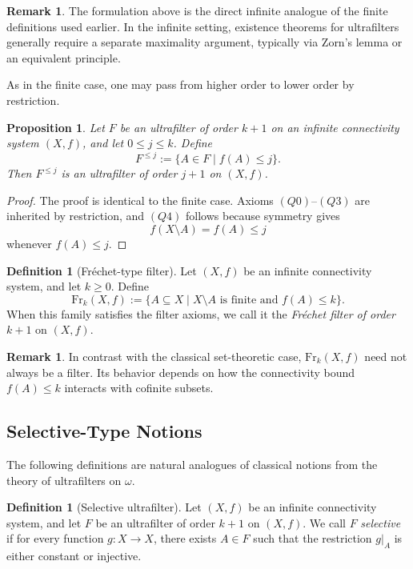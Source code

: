 \documentclass[10pt]{book}
\newtheorem{proposition}[theorem]{Proposition}
\theoremstyle{definition}
\newtheorem{remark}[theorem]{Remark}
\newtheorem{definition}[theorem]{Definition}
\begin{document}
\begin{remark}
The formulation above is the direct infinite analogue of the finite definitions used earlier.
In the infinite setting, existence theorems for ultrafilters generally require a separate maximality argument, typically via Zorn's lemma or an equivalent principle.
\end{remark}

As in the finite case, one may pass from higher order to lower order by restriction.

\begin{proposition}
\label{prop:infinite_ultrafilter_restriction}
Let \(F\) be an ultrafilter of order \(k+1\) on an infinite connectivity system \((X,f)\), and let \(0\leq j\leq k\).
Define
\[
F^{\leq j}:=\{A\in F \mid f(A)\leq j\}.
\]
Then \(F^{\leq j}\) is an ultrafilter of order \(j+1\) on \((X,f)\).
\end{proposition}

\begin{proof}
The proof is identical to the finite case.
Axioms \((Q0)\)--\((Q3)\) are inherited by restriction, and \((Q4)\) follows because symmetry gives
\[
f(X\setminus A)=f(A)\leq j
\]
whenever \(f(A)\leq j\).
\end{proof}

\begin{definition}[Fr\'echet-type filter]
\label{def:frechet_filter_infinite}
Let \((X,f)\) be an infinite connectivity system, and let \(k\geq 0\).
Define
\[
\mathrm{Fr}_k(X,f):=
\{A\subseteq X \mid X\setminus A \text{ is finite and } f(A)\leq k\}.
\]
When this family satisfies the filter axioms, we call it the \emph{Fr\'echet filter of order \(k+1\)} on \((X,f)\).
\end{definition}

\begin{remark}
In contrast with the classical set-theoretic case, \(\mathrm{Fr}_k(X,f)\) need not always be a filter.
Its behavior depends on how the connectivity bound \(f(A)\leq k\) interacts with cofinite subsets.
\end{remark}

\subsection{Selective-Type Notions}
The following definitions are natural analogues of classical notions from the theory of ultrafilters on \(\omega\).

\begin{definition}[Selective ultrafilter]
Let \((X,f)\) be an infinite connectivity system, and let \(F\) be an ultrafilter of order \(k+1\) on \((X,f)\).
We call \(F\) \emph{selective} if for every function \(g:X\to X\), there exists \(A\in F\) such that the restriction \(g|_A\) is either constant or injective.
\end{definition}
\end{document}

